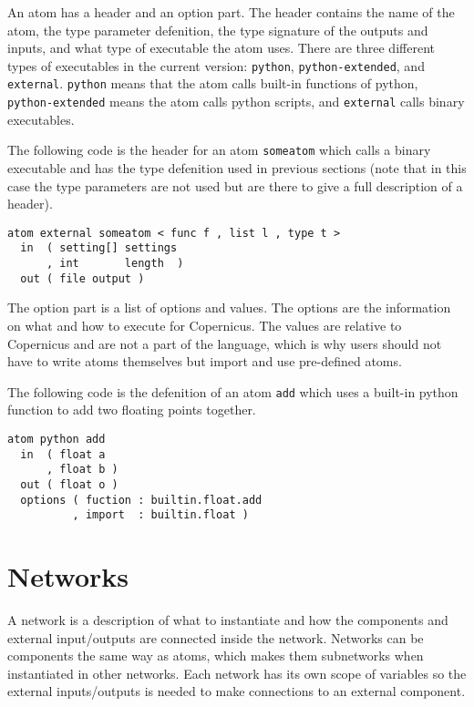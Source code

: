 An atom has a header and an option part. The header contains the name
of the atom, the type parameter defenition, the type signature of the
outputs and inputs, and what type of executable the atom uses. There
are three different types of executables in the current version:
\verb#python#, \verb#python-extended#, and
\verb#external#. \verb#python# means that the atom calls built-in
functions of python, \verb#python-extended# means the atom calls
python scripts, and \verb#external# calls binary executables.

The following code is the header for an atom \verb#someatom# which
calls a binary executable and has the type defenition used in previous
sections (note that in this case the type parameters are not used but
are there to give a full description of a header).

\begin{verbatim}
atom external someatom < func f , list l , type t >
  in  ( setting[] settings
      , int       length  )
  out ( file output )
\end{verbatim}

The option part is a list of options and values. The options are the
information on what and how to execute for Copernicus. The values are
relative to Copernicus and are not a part of the language, which is
why users should not have to write atoms themselves but import and use
pre-defined atoms.

The following code is the defenition of an atom \verb#add# which uses
a built-in python function to add two floating points together.

\begin{verbatim}
atom python add
  in  ( float a
      , float b )
  out ( float o )
  options ( fuction : builtin.float.add
          , import  : builtin.float )
\end{verbatim}

\section{Networks}\label{sec:net}

A network is a description of what to instantiate and how the
components and external input/outputs are connected inside the
network. Networks can be components the same way as atoms, which makes
them subnetworks when instantiated in other networks. Each network has
its own scope of variables so the external inputs/outputs is needed to
make connections to an external component.

